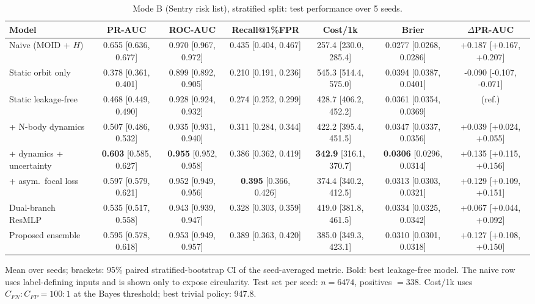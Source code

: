 \begin{table}[t]
\centering
\small
\caption{Mode B (Sentry risk list), stratified split: test performance over 5 seeds.}
\label{tab:sentry_stratified_all}
\begin{tabular}{lcccccc}
\toprule
Model & PR-AUC & ROC-AUC & Recall@1\%FPR & Cost/1k & Brier & $\Delta$PR-AUC \\
\midrule
Naive (MOID + $H$) & 0.655 \scriptsize{[0.636, 0.677]} & 0.970 \scriptsize{[0.967, 0.972]} & 0.435 \scriptsize{[0.404, 0.467]} & 257.4 \scriptsize{[230.0, 285.4]} & 0.0277 \scriptsize{[0.0268, 0.0286]} & +0.187 \scriptsize{[+0.167, +0.207]} \\
\midrule
Static orbit only & 0.378 \scriptsize{[0.361, 0.401]} & 0.899 \scriptsize{[0.892, 0.905]} & 0.210 \scriptsize{[0.191, 0.236]} & 545.3 \scriptsize{[514.4, 575.0]} & 0.0394 \scriptsize{[0.0387, 0.0401]} & -0.090 \scriptsize{[-0.107, -0.071]} \\
Static leakage-free & 0.468 \scriptsize{[0.449, 0.490]} & 0.928 \scriptsize{[0.924, 0.932]} & 0.274 \scriptsize{[0.252, 0.299]} & 428.7 \scriptsize{[406.2, 452.2]} & 0.0361 \scriptsize{[0.0354, 0.0369]} & (ref.) \\
+ N-body dynamics & 0.507 \scriptsize{[0.486, 0.532]} & 0.935 \scriptsize{[0.931, 0.940]} & 0.311 \scriptsize{[0.284, 0.344]} & 422.2 \scriptsize{[395.4, 451.5]} & 0.0347 \scriptsize{[0.0337, 0.0356]} & +0.039 \scriptsize{[+0.024, +0.055]} \\
+ dynamics + uncertainty & \textbf{0.603} \scriptsize{[0.585, 0.627]} & \textbf{0.955} \scriptsize{[0.952, 0.958]} & 0.386 \scriptsize{[0.362, 0.419]} & \textbf{342.9} \scriptsize{[316.1, 370.7]} & \textbf{0.0306} \scriptsize{[0.0296, 0.0314]} & +0.135 \scriptsize{[+0.115, +0.156]} \\
+ asym.\ focal loss & 0.597 \scriptsize{[0.579, 0.621]} & 0.952 \scriptsize{[0.949, 0.956]} & \textbf{0.395} \scriptsize{[0.366, 0.426]} & 374.4 \scriptsize{[340.2, 412.5]} & 0.0313 \scriptsize{[0.0303, 0.0321]} & +0.129 \scriptsize{[+0.109, +0.151]} \\
Dual-branch ResMLP & 0.535 \scriptsize{[0.517, 0.558]} & 0.943 \scriptsize{[0.939, 0.947]} & 0.328 \scriptsize{[0.303, 0.359]} & 419.0 \scriptsize{[381.8, 461.5]} & 0.0334 \scriptsize{[0.0325, 0.0342]} & +0.067 \scriptsize{[+0.044, +0.092]} \\
Proposed ensemble & 0.595 \scriptsize{[0.578, 0.618]} & 0.953 \scriptsize{[0.949, 0.957]} & 0.389 \scriptsize{[0.363, 0.420]} & 385.0 \scriptsize{[349.3, 423.1]} & 0.0310 \scriptsize{[0.0301, 0.0318]} & +0.127 \scriptsize{[+0.108, +0.150]} \\
\bottomrule
\end{tabular}
\par\vspace{2pt}\footnotesize Mean over seeds; brackets: 95\% paired stratified-bootstrap CI of the seed-averaged metric. Bold: best leakage-free model. The naive row uses label-defining inputs and is shown only to expose circularity. Test set per seed: $n=6474$, positives $=338$. Cost/1k uses $C_{FN}{:}C_{FP}=100{:}1$ at the Bayes threshold; best trivial policy: 947.8.
\end{table}
